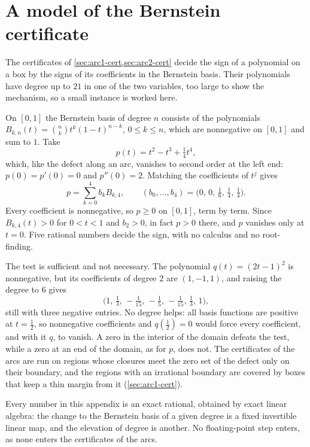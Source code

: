 \documentclass[11pt,reqno]{amsart}
\renewcommand{\_}{\origunderscore\allowbreak}
\numberwithin{equation}{section}
\theoremstyle{plain}
\theoremstyle{definition}
\theoremstyle{remark}
\begin{document}
\section{A model of the Bernstein certificate}\label{app:bernstein-toy}

The certificates of \cref{sec:arc1-cert,sec:arc2-cert} decide the sign of
a polynomial on a box by the signs of its coefficients in the Bernstein
basis. Their polynomials have degree up to $21$ in one of the two variables,
too large to show the mechanism, so a small instance is worked here.

On $[0,1]$ the Bernstein basis of degree $n$ consists of the polynomials
$B_{k,n}(t)=\binom nkt^k(1-t)^{n-k}$, $0\le k\le n$, which are nonnegative
on $[0,1]$ and sum to $1$. Take
\[
  p(t)=t^2-t^3+\tfrac14t^4 ,
\]
which, like the defect along an arc, vanishes to second order at the left
end: $p(0)=p'(0)=0$ and $p''(0)=2$. Matching the coefficients of $t^j$
gives
\[
  p=\sum_{k=0}^4b_kB_{k,4},\qquad
  (b_0,\dots,b_4)=\bigl(0,\,0,\,\tfrac16,\,\tfrac14,\,\tfrac14\bigr).
\]
Every coefficient is nonnegative, so $p\ge0$ on $[0,1]$, term by term.
Since $B_{k,4}(t)>0$ for $0<t<1$ and $b_2>0$, in fact $p>0$ there, and $p$
vanishes only at $t=0$. Five rational numbers decide the sign, with no
calculus and no root-finding.

The test is sufficient and not necessary. The polynomial
$q(t)=(2t-1)^2$ is nonnegative, but its coefficients of degree $2$ are
$(1,-1,1)$, and raising the degree to $6$ gives
\[
  \bigl(1,\,\tfrac13,\,-\tfrac1{15},\,-\tfrac15,\,-\tfrac1{15},\,\tfrac13,\,1\bigr),
\]
still with three negative entries. No degree helps: all basis functions are
positive at $t=\frac12$, so nonnegative coefficients and $q(\frac12)=0$
would force every coefficient, and with it $q$, to vanish. A zero in the
interior of the domain defeats the test, while a zero at an end of the
domain, as for $p$, does not. The certificates of the arcs are run on
regions whose closures meet the zero set of the defect only on their
boundary, and the regions with an irrational boundary are covered by boxes
that keep a thin margin from it (\cref{sec:arc1-cert}).

Every number in this appendix is an exact rational, obtained by exact
linear algebra: the change to the Bernstein basis of a given degree is a
fixed invertible linear map, and the elevation of degree is another. No
floating-point step enters, as none enters the certificates of the arcs.
\end{document}
